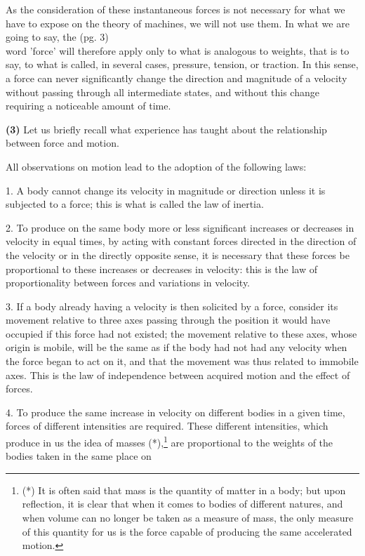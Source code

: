\documentclass{book}
\begin{document}
As the consideration of these instantaneous forces is not necessary for what we have to expose on the theory of machines, we will not use them. In what we are going to say, the
\newpage
(pg. 3)
\\
word 'force' will therefore apply only to what is analogous to weights, that is to say, to what is called, in several cases, pressure, tension, or traction.
In this sense, a force can never significantly change the direction and magnitude of a velocity without passing through all intermediate states, and without this change requiring a noticeable amount of time.

\textbf{(3)} Let us briefly recall what experience has taught about the relationship between force and motion.

All observations on motion lead to the adoption of the following laws:

1. A body cannot change its velocity in magnitude or direction unless it is subjected to a force; this is what is called the law of inertia.

2. To produce on the same body more or less significant increases or decreases in velocity in equal times, by acting with constant forces directed in the direction of the velocity or in the directly opposite sense, it is necessary that these forces be proportional to these increases or decreases in velocity: this is the law of proportionality between forces and variations in velocity.

3. If a body already having a velocity is then solicited by a force, consider its movement relative to three axes passing through the position it would have occupied if this force had not existed; the movement relative to these axes, whose origin is mobile, will be the same as if the body had not had any velocity when the force began to act on it, and that the movement was thus related to immobile axes. This is the law of independence between acquired motion and the effect of forces.

4. To produce the same increase in velocity on different bodies in a given time, forces of different intensities are required. These different intensities, which produce in us the idea of masses (*),\footnote{(*) It is often said that mass is the quantity of matter in a body; but upon reflection, it is clear that when it comes to bodies of different natures, and when volume can no longer be taken as a measure of mass, the only measure of this quantity for us is the force capable of producing the same accelerated motion.} are proportional to the weights of the bodies taken in the same place on
\end{document}
